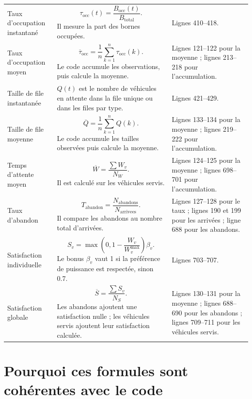 \documentclass[11pt]{article}
\begin{document}
\begin{longtable}{L{0.25\textwidth} L{0.38\textwidth} L{0.26\textwidth}}
Taux d'occupation instantané &
\[
\tau_{\mathrm{occ}}(t)=\frac{B_{\mathrm{occ}}(t)}{B_{\mathrm{total}}}.
\]
Il mesure la part des bornes occupées. &
Lignes 410--418. \\

Taux d'occupation moyen &
\[
\overline{\tau}_{\mathrm{occ}}=\frac{1}{n}\sum_{k=1}^{n}\tau_{\mathrm{occ}}(k).
\]
Le code accumule les observations, puis calcule la moyenne. &
Lignes 121--122 pour la moyenne ; lignes 213--218 pour l'accumulation. \\

Taille de file instantanée &
$Q(t)$ est le nombre de véhicules en attente dans la file unique ou dans les files par type. &
Lignes 421--429. \\

Taille de file moyenne &
\[
\overline{Q}=\frac{1}{n}\sum_{k=1}^{n}Q(k).
\]
Le code accumule les tailles observées puis calcule la moyenne. &
Lignes 133--134 pour la moyenne ; lignes 219--222 pour l'accumulation. \\

Temps d'attente moyen &
\[
\overline{W}=\frac{\sum W_v}{N_W}.
\]
Il est calculé sur les véhicules servis. &
Lignes 124--125 pour la moyenne ; lignes 698--701 pour l'accumulation. \\

Taux d'abandon &
\[
T_{\mathrm{abandon}}=\frac{N_{\mathrm{abandons}}}{N_{\mathrm{arrivees}}}.
\]
Il compare les abandons au nombre total d'arrivées. &
Lignes 127--128 pour le taux ; lignes 190 et 199 pour les arrivées ; ligne 688 pour les abandons. \\

Satisfaction individuelle &
\[
S_v=\max\left(0,1-\frac{W_v}{W_v^{\max}}\right)\beta_v.
\]
Le bonus $\beta_v$ vaut 1 si la préférence de puissance est respectée, sinon 0.7. &
Lignes 703--707. \\

Satisfaction globale &
\[
\overline{S}=\frac{\sum S_v}{N_S}.
\]
Les abandons ajoutent une satisfaction nulle ; les véhicules servis ajoutent leur satisfaction calculée. &
Lignes 130--131 pour la moyenne ; lignes 688--690 pour les abandons ; lignes 709--711 pour les véhicules servis. \\

\end{longtable}

\section{Pourquoi ces formules sont cohérentes avec le code}
\end{document}
